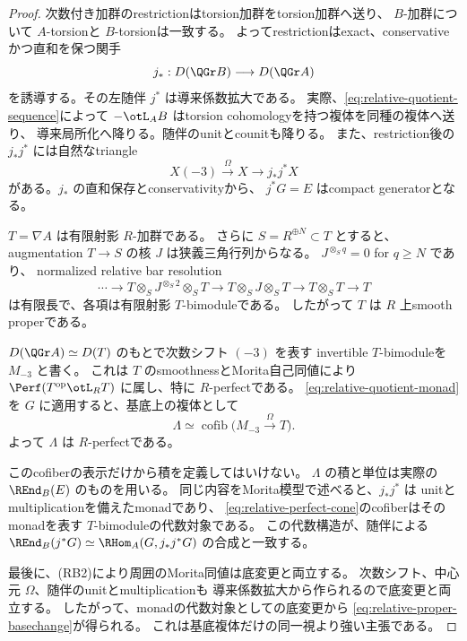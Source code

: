\begin{proof}
 次数付き加群のrestrictionはtorsion加群をtorsion加群へ送り、
 \(B\)-加群について \(A\)-torsionと \(B\)-torsionは一致する。
 よってrestrictionはexact、conservativeかつ直和を保つ関手
 \[
 j_*:D(\QGr B)\longrightarrow D(\QGr A)
 \]
 を誘導する。その左随伴 \(j^*\) は導来係数拡大である。
 実際、\eqref{eq:relative-quotient-sequence}によって
 \(-\otL_A B\) はtorsion cohomologyを持つ複体を同種の複体へ送り、
 導来局所化へ降りる。随伴のunitとcounitも降りる。
 また、restriction後の \(j_*j^*\) には自然なtriangle
 \[
 X(-3)\xrightarrow{\Omega}X\longrightarrow j_*j^*X
 \tag{M}\label{eq:relative-quotient-monad}
 \]
 がある。\(j_*\) の直和保存とconservativityから、
 \(j^*G=E\) はcompact generatorとなる。

 \(T=\nabla A\) は有限射影 \(R\)-加群である。
 さらに \(S=R^{\oplus N}\subset T\) とすると、
 augmentation \(T\to S\) の核 \(J\) は狭義三角行列からなる。
 \(J^{\otimes_S q}=0\) for \(q\ge N\) であり、
 normalized relative bar resolution
 \[
 \cdots\longrightarrow
 T\otimes_SJ^{\otimes_S2}\otimes_ST
 \longrightarrow T\otimes_SJ\otimes_ST
 \longrightarrow T\otimes_ST\longrightarrow T
 \]
 は有限長で、各項は有限射影 \(T\)-bimoduleである。
 したがって \(T\) は \(R\) 上smooth properである。

 \(D(\QGr A)\simeq D(T)\) のもとで次数シフト \((-3)\) を表す
 invertible \(T\)-bimoduleを \(M_{-3}\) と書く。
 これは \(T\) のsmoothnessとMorita自己同値により
 \(\Perf(T^{\mathrm{op}}\otL_RT)\) に属し、特に \(R\)-perfectである。
 \eqref{eq:relative-quotient-monad}を \(G\) に適用すると、基底上の複体として
 \[
 \Lambda\simeq
 \operatorname{cofib}\bigl(M_{-3}\xrightarrow{\Omega}T\bigr).
 \tag{C}\label{eq:relative-perfect-cone}
 \]
 よって \(\Lambda\) は \(R\)-perfectである。

 このcofiberの表示だけから積を定義してはいけない。
 \(\Lambda\) の積と単位は実際の \(\REnd_B(E)\) のものを用いる。
 同じ内容をMorita模型で述べると、\(j_*j^*\) は
 unitとmultiplicationを備えたmonadであり、
 \eqref{eq:relative-perfect-cone}のcofiberはそのmonadを表す
 \(T\)-bimoduleの代数対象である。
 この代数構造が、随伴による
 \(\REnd_B(j^*G)\simeq\RHom_A(G,j_*j^*G)\) の合成と一致する。

 最後に、(RB2)により周囲のMorita同値は底変更と両立する。
 次数シフト、中心元 \(\Omega\)、随伴のunitとmultiplicationも
 導来係数拡大から作られるので底変更と両立する。
 したがって、monadの代数対象としての底変更から
 \eqref{eq:relative-proper-basechange}が得られる。
 これは基底複体だけの同一視より強い主張である。
\end{proof}

